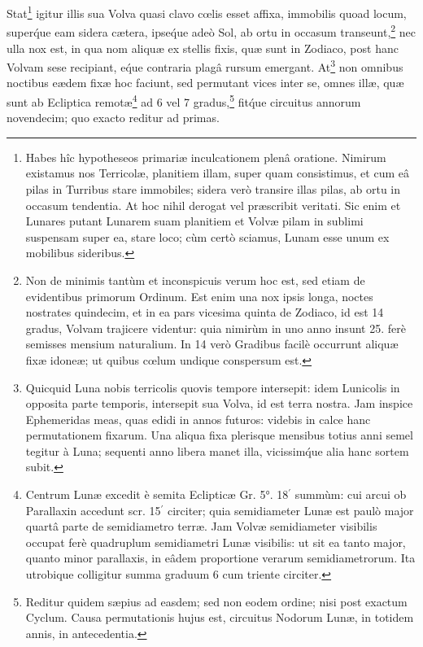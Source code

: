 \documentclass[a4paper, 11pt, oneside, polutonikogreek, german]{article}
\begin{document}
Stat\footnote{Habes hîc hypotheseos primariæ inculcationem plenâ oratione. Nimirum existamus nos Terricolæ, planitiem illam, super quam consistimus, et cum eâ pilas in Turribus stare immobiles; sidera verò transire illas pilas, ab ortu in occasum tendentia. At hoc nihil derogat vel præscribit veritati. Sic enim et Lunares putant Lunarem suam planitiem et Volvæ pilam in sublimi suspensam super ea, stare loco; cùm certò sciamus, Lunam esse unum ex mobilibus sideribus.} igitur illis sua Volva quasi clavo cœlis esset affixa, immobilis quoad locum, super\'que eam sidera cætera, ipse\'que adeò Sol, ab ortu in occasum transeunt,\footnote{Non de minimis tantùm et inconspicuis verum hoc est, sed etiam de evidentibus primorum Ordinum. Est enim una nox ipsis longa, noctes nostrates quindecim, et in ea pars vicesima quinta de Zodiaco, id est 14 gradus, Volvam trajicere videntur: quia nimirùm in uno anno insunt 25. ferè semisses mensium naturalium. In 14 verò Gradibus facilè occurrunt aliquæ fixæ idoneæ; ut quibus cœlum undique conspersum est.} nec ulla nox est, in qua nom aliquæ ex stellis fixis, quæ sunt in Zodiaco, post hanc Volvam sese recipiant, e\'que contraria plagâ rursum emergant. At\footnote{Quicquid Luna nobis terricolis quovis tempore intersepit: idem Lunicolis in opposita parte temporis, intersepit sua Volva, id est terra nostra. Jam inspice Ephemeridas meas, quas edidi in annos futuros: videbis in calce hanc permutationem fixarum. Una aliqua fixa plerisque mensibus totius anni semel tegitur à Luna; sequenti anno libera manet illa, vicissim\'que alia hanc sortem subit.} non omnibus noctibus eædem fixæ hoc faciunt, sed permutant vices inter se, omnes illæ, quæ sunt ab Ecliptica remotæ\footnote{Centrum Lunæ excedit è semita Eclipticæ Gr. 5°. 18$^{\prime}$ summùm: cui arcui ob Parallaxin accedunt scr. 15$^{\prime}$ circiter; quia semidiameter Lunæ est paulò major quartâ parte de semidiametro terræ. Jam Volvæ semidiameter visibilis occupat ferè quadruplum semidiametri Lunæ visibilis: ut sit ea tanto major, quanto minor parallaxis, in eâdem proportione verarum semidiametrorum. Ita utrobique colligitur summa graduum 6 cum triente circiter.} ad 6 vel 7 gradus,\footnote{Reditur quidem sæpius ad easdem; sed non eodem ordine; nisi post exactum Cyclum. Causa permutationis hujus est, circuitus Nodorum Lunæ, in totidem annis, in antecedentia.} fit\'que circuitus annorum novendecim; quo exacto reditur ad primas.
\end{document}
